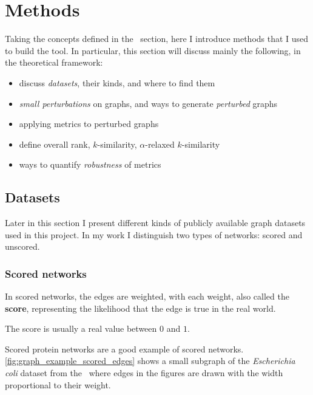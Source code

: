 \section{Methods}\label{sec:methods}

Taking the concepts defined in the~ section, here I introduce methods that I used to build the \graffs tool.
In particular, this section will discuss mainly the following, in the theoretical framework:
\begin{itemize}
    \item discuss \textsl{datasets}, their kinds, and where to find them
    \item \textsl{small perturbations} on graphs, and ways to generate \textsl{perturbed} graphs
    \item applying metrics to perturbed graphs
    \item define overall rank, $k$-similarity, $\alpha$-relaxed $k$-similarity
    \item ways to quantify \textsl{robustness} of metrics
\end{itemize}

\subsection{Datasets}\label{sec:datasets}

Later in this section I present different kinds of publicly available graph datasets used in this project.
In my work I distinguish two types of networks: scored and unscored.

\subsubsection{Scored networks}\label{sec:scored_networks}

In scored networks, the edges are weighted, with each weight, also called the \textbf{score}, representing the likelihood that the edge is true in the real world.

The score is usually a real value between $0$ and $1$.



Scored protein networks are a good example of scored networks.
\autoref{fig:graph_example_scored_edges} shows a small subgraph of the \textsl{Escherichia coli} dataset from the~ where edges in the figures are drawn with the width proportional to their weight.


